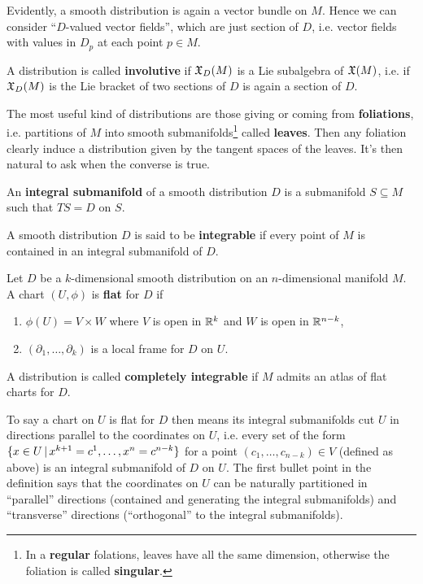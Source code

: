 Evidently, a smooth distribution is again a vector bundle on $M$. Hence we can consider ``$D$-valued vector fields'', which are just section of $D$, i.e. vector fields with values in $D_p$ at each point $p \in M$.

\begin{definition}
	A distribution is called \textbf{involutive} if $\mathfrak{X}_D(M)$ is a Lie subalgebra of $\mathfrak{X}(M)$, i.e. if $\mathfrak{X}_D(M)$ is the Lie bracket of two sections of $D$ is again a section of $D$.
\end{definition}

The most useful kind of distributions are those giving or coming from \textbf{foliations}, i.e. partitions of $M$ into smooth submanifolds\footnote{In a \textbf{regular} folations, leaves have all the same dimension, otherwise the foliation is called \textbf{singular}.} called \textbf{leaves}. Then any foliation clearly induce a distribution given by the tangent spaces of the leaves. It's then natural to ask when the converse is true.

\begin{definition}
	An \textbf{integral submanifold} of a smooth distribution $D$ is a submanifold $S \subseteq M$ such that $TS = D$ on $S$.
\end{definition}

\begin{definition}
	A smooth distribution $D$ is said to be \textbf{integrable} if every point of $M$ is contained in an integral submanifold of $D$.
\end{definition}

\begin{definition}
	Let $D$ be a $k$-dimensional smooth distribution on an $n$-dimensional manifold $M$. A chart $(U,\phi)$ is \textbf{flat} for $D$ if
	\begin{enumerate}
		\item $\phi(U) = V \times W$ where $V$ is open in $\mathbb{R}^k$ and $W$ is open in $\mathbb{R}^{n-k}$,
		\item $(\partial_1, \ldots, \partial_k)$ is a local frame for $D$ on $U$.
	\end{enumerate}
	A distribution is called \textbf{completely integrable} if $M$ admits an atlas of flat charts for $D$.
\end{definition}

To say a chart on $U$ is flat for $D$ then means its integral submanifolds cut $U$ in directions parallel to the coordinates on $U$, i.e. every set of the form $\{x \in U \,|\, x^{k+1} = c^1, \ldots, x^n=c^{n-k}\}$ for a point $(c_1, \ldots, c_{n-k}) \in V$ (defined as above) is an integral submanifold of $D$ on $U$. The first bullet point in the definition says that the coordinates on $U$ can be naturally partitioned in ``parallel'' directions (contained and generating the integral submanifolds) and ``transverse'' directions (``orthogonal'' to the integral submanifolds).

